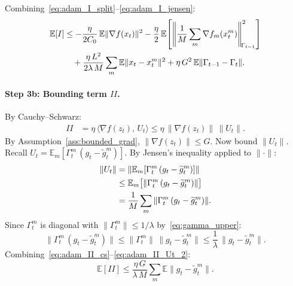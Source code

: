 \documentclass{article}
\begin{document}
Combining~\eqref{eq:adam_I_split}--\eqref{eq:adam_I_jensen}:
\begin{align}
\mathbb{E}[I]
&\leq -\frac{\eta}{2C_0}\,\mathbb{E}\|\nabla f(x_t)\|^2
  - \frac{\eta}{2}\,\mathbb{E}\!\left[\left\|
  \frac{1}{M}\sum_m \nabla f_m(x_t^m)
  \right\|_{\!\Gamma_{t-1}}^2\right] \notag \\
&\quad+ \frac{\eta\,L^2}{2\lambda\,M}\sum_m
  \mathbb{E}\|x_t - x_t^m\|^2
  + \eta\,G^2\,\mathbb{E}\|\Gamma_{t-1} - \Gamma_t\|.
\label{eq:adam_I_final}
\end{align}

\paragraph{Step 3b: Bounding term $II$.}

By Cauchy--Schwarz:
\begin{align}
II &= \eta\,\langle \nabla f(z_t),\, U_t \rangle
   \leq \eta\,\|\nabla f(z_t)\|\,\|U_t\|.
\label{eq:adam_II_cs}
\end{align}
By Assumption~\ref{ass:bounded_grad}, $\|\nabla f(z_t)\| \leq G$. Now bound
$\|U_t\|$. Recall $U_t = \mathbb{E}_m[\Gamma_t^m\,(g_t - \widetilde{g}_t^m)]$.
By Jensen's inequality applied to $\|\cdot\|$:
\begin{align}
\|U_t\| &= \left\|\mathbb{E}_m[\Gamma_t^m\,(g_t - \widetilde{g}_t^m)]
   \right\| \notag \\
&\leq \mathbb{E}_m\bigl[\|\Gamma_t^m\,(g_t - \widetilde{g}_t^m)\|\bigr]
   \notag \\
&= \frac{1}{M}\sum_m \|\Gamma_t^m\,(g_t - \widetilde{g}_t^m)\|.
\label{eq:adam_II_Ut_1}
\end{align}
Since $\Gamma_t^m$ is diagonal with $\|\Gamma_t^m\| \leq 1/\lambda$
by~\eqref{eq:gamma_upper}:
\begin{equation}
\|\Gamma_t^m\,(g_t - \widetilde{g}_t^m)\|
\leq \|\Gamma_t^m\|\,\|g_t - \widetilde{g}_t^m\|
\leq \frac{1}{\lambda}\,\|g_t - \widetilde{g}_t^m\|.
\label{eq:adam_II_Ut_2}
\end{equation}
Combining~\eqref{eq:adam_II_cs}--\eqref{eq:adam_II_Ut_2}:
\begin{equation}
\mathbb{E}[II]
\leq \frac{\eta\,G}{\lambda\,M}\sum_m
\mathbb{E}\|g_t - \widetilde{g}_t^m\|.
\label{eq:adam_II_final}
\end{equation}
\end{document}
